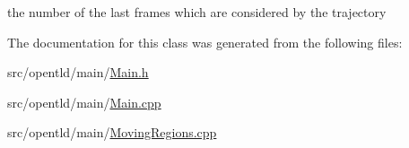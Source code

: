 the number of the last frames which are considered by the trajectory 



The documentation for this class was generated from the following files\-:\begin{DoxyCompactItemize}
\item 
src/opentld/main/\hyperlink{Main_8h}{Main.\-h}\item 
src/opentld/main/\hyperlink{Main_8cpp}{Main.\-cpp}\item 
src/opentld/main/\hyperlink{MovingRegions_8cpp}{Moving\-Regions.\-cpp}\end{DoxyCompactItemize}
